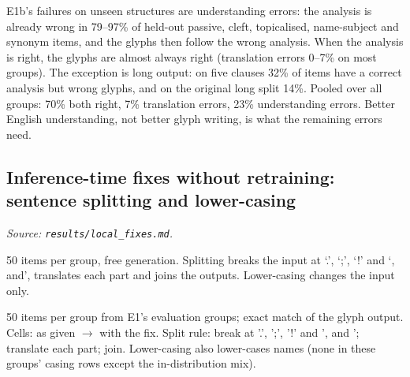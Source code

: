 \documentclass[10pt,a4paper,oneside]{article}
\begin{document}
\begin{infer}E1b's failures on unseen structures are understanding errors: the analysis is already wrong in 79--97\% of
held-out passive, cleft, topicalised, name-subject and synonym items, and the glyphs then follow the wrong analysis.
When the analysis is right, the glyphs are almost always right (translation errors 0--7\% on most groups). The
exception is long output: on five clauses 32\% of items have a correct analysis but wrong glyphs, and on the original
long split 14\%. Pooled over all groups: 70\% both right, 7\% translation errors, 23\% understanding errors. Better
English understanding, not better glyph writing, is what the remaining errors need.\end{infer}
\subsection{Inference-time fixes without retraining: sentence splitting and lower-casing}
\textit{Source: \texttt{results/local\_fixes.md}.}


\begin{caveat}50 items per group, free generation. Splitting breaks the input at `.', `;', `!' and `, and', translates each
part and joins the outputs. Lower-casing changes the input only.\end{caveat}
50 items per group from E1's evaluation groups; exact match of the glyph output. Cells: as given $\rightarrow$ with the fix. Split rule: break at '.', ';', '!' and ', and '; translate each part; join. Lower-casing also lower-cases names (none in these groups' casing rows except the in-distribution mix).
\end{document}
